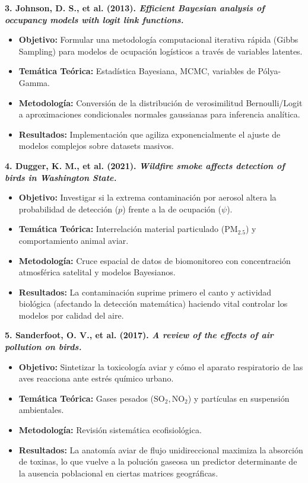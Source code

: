 \documentclass[12pt]{article}
\begin{document}
\textbf{3. Johnson, D. S., et al. (2013). \textit{Efficient Bayesian analysis of occupancy models with logit link functions.}}
\begin{itemize}[leftmargin=0.5cm]
    \item \textbf{Objetivo:} Formular una metodología computacional iterativa rápida (Gibbs Sampling) para modelos de ocupación logísticos a través de variables latentes.
    \item \textbf{Temática Teórica:} Estadística Bayesiana, MCMC, variables de Pólya-Gamma.
    \item \textbf{Metodología:} Conversión de la distribución de verosimilitud Bernoulli/Logit a aproximaciones condicionales normales gaussianas para inferencia analítica.
    \item \textbf{Resultados:} Implementación que agiliza exponencialmente el ajuste de modelos complejos sobre datasets masivos.
\end{itemize}

\textbf{4. Dugger, K. M., et al. (2021). \textit{Wildfire smoke affects detection of birds in Washington State.}}
\begin{itemize}[leftmargin=0.5cm]
    \item \textbf{Objetivo:} Investigar si la extrema contaminación por aerosol altera la probabilidad de detección ($p$) frente a la de ocupación ($\psi$).
    \item \textbf{Temática Teórica:} Interrelación material particulado ($\text{PM}_{2.5}$) y comportamiento animal aviar.
    \item \textbf{Metodología:} Cruce espacial de datos de biomonitoreo con concentración atmosférica satelital y modelos Bayesianos.
    \item \textbf{Resultados:} La contaminación suprime primero el canto y actividad biológica (afectando la detección matemática) haciendo vital controlar los modelos por calidad del aire.
\end{itemize}

\textbf{5. Sanderfoot, O. V., et al. (2017). \textit{A review of the effects of air pollution on birds.}}
\begin{itemize}[leftmargin=0.5cm]
    \item \textbf{Objetivo:} Sintetizar la toxicología aviar y cómo el aparato respiratorio de las aves reacciona ante estrés químico urbano.
    \item \textbf{Temática Teórica:} Gases pesados ($\text{SO}_2, \text{NO}_2$) y partículas en suspensión ambientales.
    \item \textbf{Metodología:} Revisión sistemática ecofisiológica.
    \item \textbf{Resultados:} La anatomía aviar de flujo unidireccional maximiza la absorción de toxinas, lo que vuelve a la polución gaseosa un predictor determinante de la ausencia poblacional en ciertas matrices geográficas.
\end{itemize}
\end{document}
